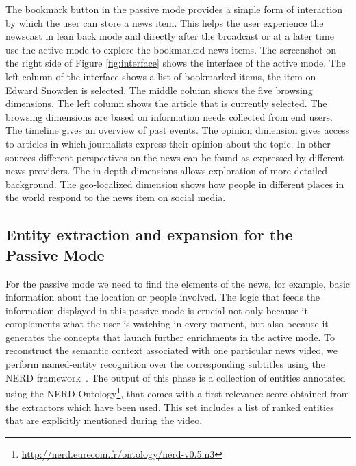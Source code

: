 \documentclass{llncs}
\begin{document}
The bookmark button in the passive mode provides a simple form of interaction by which the user can store a news item. This helps the user experience the newscast in lean back mode and directly after the broadcast or at a later time use the active mode to explore the bookmarked news items. The screenshot on the right side of Figure \ref{fig:interface} shows the interface of the active mode. The left column of the interface shows a list of bookmarked items, the item on Edward Snowden is selected. The middle column shows the five browsing dimensions. The left column shows the article that is currently selected. The browsing dimensions are based on information needs collected from end users. The timeline gives an overview of past events. The opinion dimension gives access to articles in which journalists express their opinion about the topic. In other sources different perspectives on the news can be found as expressed by different news providers. The in depth dimensions allows exploration of more detailed background. The geo-localized dimension shows how people in different places in the world respond to the news item on social media.


\subsection{Entity extraction and expansion for the Passive Mode}
\label{sec:leanbackmode}

For  the passive mode we need to find the elements of the news, for example, basic information about the location or people involved. The logic that feeds the information displayed in this passive mode is crucial not only because it complements what the user is watching in every moment, but also because it generates the concepts that launch further enrichments in the active mode. To reconstruct the semantic context associated with one particular news video, we perform named-entity recognition over the corresponding subtitles using the NERD framework~\cite{Rizzo2012b}. The output of this phase is a collection of entities annotated using the NERD Ontology\footnote{\fontsize{8pt}{1em}\selectfont \url{http://nerd.eurecom.fr/ontology/nerd-v0.5.n3}}, that comes with a first relevance score obtained from the extractors which have been used. This set includes a list of ranked entities that are explicitly mentioned during the video.
\end{document}
